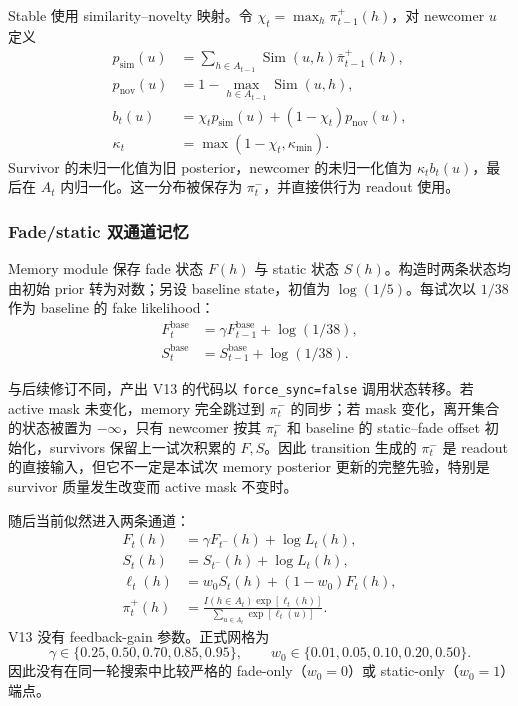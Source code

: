 Stable 使用 similarity--novelty 映射。令 $\chi_t=\max_h\pi_{t-1}^{+}(h)$，对 newcomer $u$ 定义
\begin{align}
    p_{\mathrm{sim}}(u)
    &=\sum_{h\in A_{t-1}}\operatorname{Sim}(u,h)
      \bar\pi_{t-1}^{+}(h),\\
    p_{\mathrm{nov}}(u)
    &=1-\max_{h\in A_{t-1}}\operatorname{Sim}(u,h),\\
    b_t(u)&=\chi_t p_{\mathrm{sim}}(u)+(1-\chi_t)p_{\mathrm{nov}}(u),\\
    \kappa_t&=\max(1-\chi_t,\kappa_{\min}).
    \label{eq:modelv13-stable-p2p}
\end{align}
Survivor 的未归一化值为旧 posterior，newcomer 的未归一化值为 $\kappa_tb_t(u)$，最后在 $A_t$ 内归一化。这一分布被保存为 $\pi_t^-$，并直接供行为 readout 使用。


\subsubsection{Fade/static 双通道记忆}

Memory module 保存 fade 状态 $F(h)$ 与 static 状态 $S(h)$。构造时两条状态均由初始 prior 转为对数；另设 baseline state，初值为 $\log(1/5)$。每试次以 $1/38$ 作为 baseline 的 fake likelihood：
\begin{align}
    F_t^{\mathrm{base}}&=\gamma F_{t-1}^{\mathrm{base}}+\log(1/38),\\
    S_t^{\mathrm{base}}&=S_{t-1}^{\mathrm{base}}+\log(1/38).
    \label{eq:modelv13-memory-baseline}
\end{align}

与后续修订不同，产出 V13 的代码以 \texttt{force\_sync=false} 调用状态转移。若 active mask 未变化，memory 完全跳过到 $\pi_t^-$ 的同步；若 mask 变化，离开集合的状态被置为 $-\infty$，只有 newcomer 按其 $\pi_t^-$ 和 baseline 的 static--fade offset 初始化，survivors 保留上一试次积累的 $F,S$。因此 transition 生成的 $\pi_t^-$ 是 readout 的直接输入，但它不一定是本试次 memory posterior 更新的完整先验，特别是 survivor 质量发生改变而 active mask 不变时。

随后当前似然进入两条通道：
\begin{align}
    F_t(h)&=\gamma F_{t^-}(h)+\log L_t(h),\\
    S_t(h)&=S_{t^-}(h)+\log L_t(h),\\
    \ell_t(h)&=w_0S_t(h)+(1-w_0)F_t(h),\\
    \pi_t^+(h)&=
    \frac{I(h\in A_t)\exp[\ell_t(h)]}
    {\sum_{u\in A_t}\exp[\ell_t(u)]}.
    \label{eq:modelv13-dual-memory}
\end{align}
V13 没有 feedback-gain 参数。正式网格为
\begin{equation}
    \gamma\in\{0.25,0.50,0.70,0.85,0.95\},
    \qquad
    w_0\in\{0.01,0.05,0.10,0.20,0.50\}.
    \label{eq:modelv13-memory-grid}
\end{equation}
因此没有在同一轮搜索中比较严格的 fade-only（$w_0=0$）或 static-only（$w_0=1$）端点。


